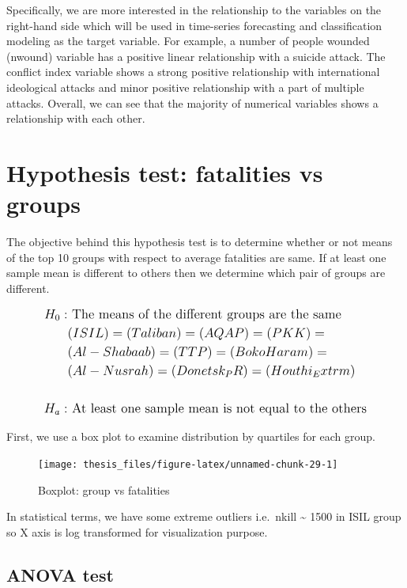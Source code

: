 \documentclass[11pt,oneside,a4paper]{reedthesis}
\begin{document}
Specifically, we are more interested in the relationship to the
variables on the right-hand side which will be used in time-series
forecasting and classification modeling as the target variable. For
example, a number of people wounded (nwound) variable has a positive
linear relationship with a suicide attack. The conflict index variable
shows a strong positive relationship with international ideological
attacks and minor positive relationship with a part of multiple attacks.
Overall, we can see that the majority of numerical variables shows a
relationship with each other.

\section{Hypothesis test: fatalities vs
groups}\label{hypothesis-test-fatalities-vs-groups}

The objective behind this hypothesis test is to determine whether or not
means of the top 10 groups with respect to average fatalities are same.
If at least one sample mean is different to others then we determine
which pair of groups are different.

\[
\large
\begin{aligned}
{H_0 : } & \text{ The means of the different groups are the same} \\
      &{(ISIL)} = {(Taliban)} = {(AQAP)} = {(PKK)} = \\
      &{(Al-Shabaab)} = {(TTP)} = {(Boko Haram)} =  \\
      &{(Al-Nusrah)} = {(Donetsk_PR)} = {(Houthi_Extrm)} \\ \\
H_a: & \text{ At least one sample mean is not equal to the others} 
\end{aligned}
\]

First, we use a box plot to examine distribution by quartiles for each
group.
\begin{figure}
\texttt{[image: thesis\_files/figure-latex/unnamed-chunk-29-1]} \caption{Boxplot: group vs fatalities}\label{fig:unnamed-chunk-29}
\end{figure}
In statistical terms, we have some extreme outliers i.e.~nkill
\textasciitilde{} 1500 in ISIL group so X axis is log transformed for
visualization purpose.

\subsection{ANOVA test}\label{anova-test}
\end{document}
